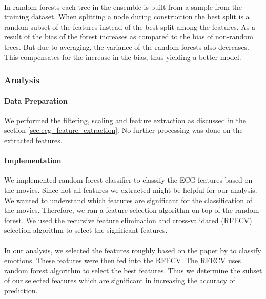 \paragraph{} In random forests each tree in the ensemble is built from a sample from the training dataset. When splitting a node during construction the best split is a random subset of the features instead of the best split among the features. As a result of the bias of the forest increases as compared to the bias of non-random trees. But due to averaging, the variance of the random forests also decreases. This compensates for the increase in the bias, thus yielding a better model.

\subsubsection{Analysis}
\paragraph{Data Preparation}  We performed the filtering, scaling and feature extraction as discussed in the section \ref{sec:ecg_feature_extraction}. No further processing was done on the extracted features.

\paragraph{Implementation} We implemented random forest classifier to classify the ECG features based on the movies. Since not all features we extracted might be helpful for our analysis. We wanted to understand which features are significant for the classification of the movies. Therefore, we ran a feature selection algorithm on top of the random forest. We used the recursive feature elimination and cross-validated (RFECV) selection algorithm to select the significant features.

\paragraph{} In our analysis, we selected the features roughly based on the paper by \citeauthor{zhao_emotion_2016} to classify emotions. These features were then fed into the RFECV. The RFECV uses random forest algorithm to select the best features. Thus we determine the subset of our selected features which are significant in increasing the accuracy of prediction.

